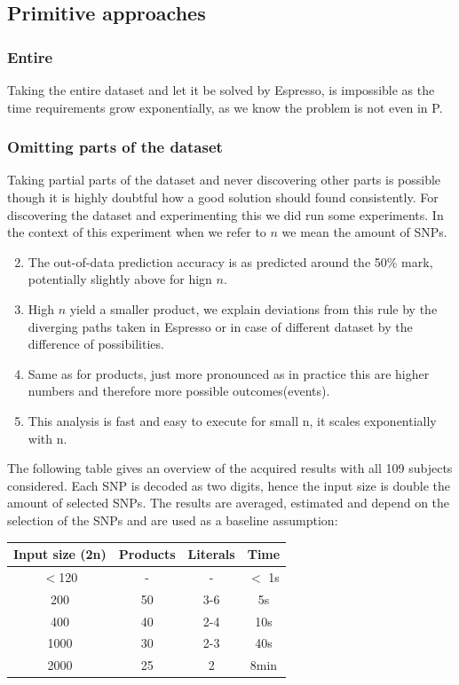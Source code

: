 \documentclass[letterpaper, 11pt]{article}
\begin{document}
\subsection{Primitive approaches}
\subsubsection{Entire}
Taking the entire dataset and let it be solved by Espresso, is impossible as the time requirements grow exponentially, as we know the problem is not even in P. 
\subsubsection{Omitting parts of the dataset}
\label{sec:omit}
Taking partial parts of the dataset and never discovering other parts is possible though it is highly doubtful how a good solution should found consistently. For discovering the dataset and experimenting this we did run some experiments. In the context of this experiment when we refer to $n$ we mean the amount of SNPs. 

\begin{enumerate} 
\setcounter{enumi}{1}
\item The out-of-data prediction accuracy is as predicted around the 50\% mark, potentially slightly above for hign $n$. 
\setcounter{enumi}{3}
\item High $n$ yield a smaller product, we explain deviations from this rule by the diverging paths taken in Espresso or in case of different dataset by the difference of possibilities. 
\item Same as for products, just more pronounced as in practice this are higher numbers and therefore more possible outcomes(events). 
\item This analysis is fast and easy to execute for small n, it scales exponentially with n. 
\end{enumerate}


The following table gives an overview of the acquired results with all 109 subjects considered. Each SNP is decoded as two digits, hence the input size is double the amount of selected SNPs. The results are averaged, estimated and depend on the selection of the SNPs and are used as a baseline assumption:

\begin{center}
\begin{tabular}{ c| c| c| c}
 \textbf{Input size (2n)} & \textbf{Products} & \textbf{Literals} & \textbf{Time} \\ \hline
 $<$120& -&-&$<$ 1s\\
 200 & 50 & 3-6&5s\\  
 400 & 40 & 2-4  & 10s \\
 1000& 30&2-3&40s\\
 2000&25&2&8min
\end{tabular}
\end{center}
\end{document}
